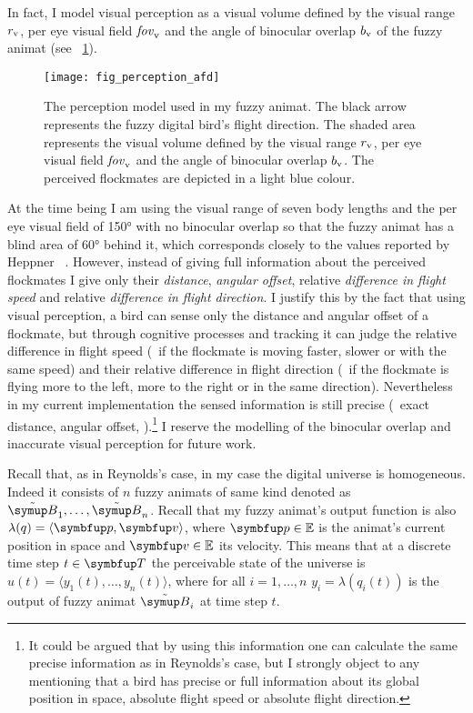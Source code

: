 In fact, I model visual perception as a visual volume defined by the visual range $r_\textnormal{v}$, per eye visual field $\mathit{fov}_\textnormal{v}$ and the angle of binocular overlap $b_\textnormal{v}$ of the fuzzy animat (see \fig~\ref{fig:perception:afd}).
%
\begin{figure}
  \texttt{[image: fig\_perception\_afd]}
  \caption{The perception model used in my fuzzy animat. The black arrow represents the fuzzy digital bird's flight direction. The shaded area represents the visual volume defined by the visual range $r_\textnormal{v}$, per eye visual field $\mathit{fov}_\textnormal{v}$ and the angle of binocular overlap $b_\textnormal{v}$. The perceived flockmates are depicted in a light blue colour.}
  \label{fig:perception:afd}
\end{figure}
%
At the time being I am using the visual range of seven body lengths and the per eye visual field of \ang{150} with no binocular overlap so that the fuzzy animat has a blind area of \ang{60} behind it, which corresponds closely to the values reported by Heppner \etal\ \cite{heppner:1985}. However, instead of giving full information about the perceived flockmates I give only their \emph{distance}, \emph{angular offset}, relative \emph{difference in flight speed} and relative \emph{difference in flight direction}. I justify this by the fact that using visual perception, a bird can sense only the distance and angular offset of a flockmate, but through cognitive processes and tracking it can judge the relative difference in flight speed (\ie\ if the flockmate is moving faster, slower or with the same speed) and their relative difference in flight direction (\ie\ if the flockmate is flying more to the left, more to the right or in the same direction). Nevertheless in my current implementation the sensed information is still precise (\ie\ exact distance, angular offset, \etc).\footnote{It could be argued that by using this information one can calculate the same precise information as in Reynolds's \cite{reynolds:1999} case, but I strongly object to any mentioning that a bird has precise or full information about its global position in space, absolute flight speed or absolute flight direction.} I reserve the modelling of the binocular overlap and inaccurate visual perception for future work.

Recall that, as in Reynolds's case, in my case the digital universe is homogeneous. Indeed it consists of $n$ fuzzy animats of same kind denoted as $\fautom{B}_1,\ldots,\fautom{B}_n$. Recall that my fuzzy animat's output function is also $\lambda(q)=\langle \vect{p}, \vect{v} \rangle$, where $\vect{p} \in \E$ is the animat's current position in space and $\vect{v} \in \E$ its velocity. This means that at a discrete time step $t \in \set{T}$ the perceivable state of the universe is $u(t)=\langle y_1(t),\ldots,y_n(t) \rangle$, where for all $i=1,\ldots,n$ $y_i=\lambda(q_i(t))$ is the output of fuzzy animat $\fautom{B}_i$ at time step $t$.

